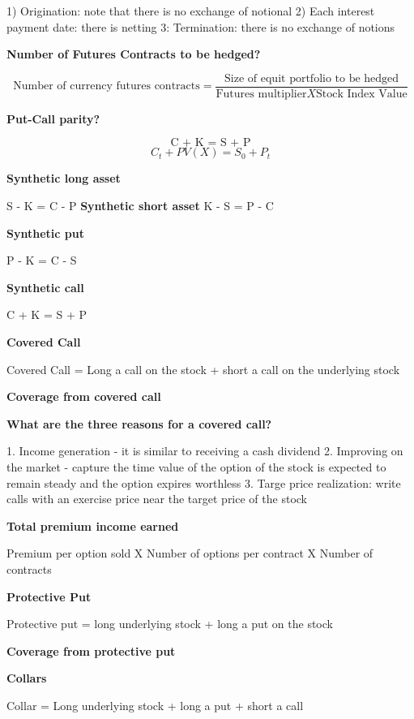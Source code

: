 \documentclass[12pt]{article}
\begin{document}
1) Origination: note that there is no exchange of notional
2) Each interest payment date: there is netting
3: Termination: there is no exchange of notions



\textbf{Number of Futures Contracts to be hedged?}

$$
\text{Number of currency futures contracts} = \dfrac{\text{Size of equit portfolio to be hedged}}{\text{Futures multiplier} X \text{Stock Index Value}}
$$



\textbf{Put-Call parity?}

$$
\text{C + K = S + P} 
$$
$$
{C_t + PV(X) = S_0 + P_t}
$$


\begin{framed}

\textbf{Synthetic long asset}

S - K = C - P
\textbf{Synthetic short asset}
K - S = P - C

\textbf{Synthetic put}

P -  K   = C - S

\textbf{Synthetic call}
	
C + K = S + P

\end{framed}


\textbf{Covered Call}

Covered Call = Long a call on the stock + short a call on the underlying stock 

\textbf{Coverage from covered call}

\textbf{What are the three reasons for a covered call?}

1. Income generation - it is similar to receiving a cash dividend
2. Improving on the market - capture the time value of the option of the stock is expected to remain steady and the option expires worthless
3. Targe price realization: write calls with an exercise price near the target price of the stock 

\textbf{Total premium income earned}

Premium per option sold X Number of options per contract X Number of contracts

\textbf{Protective Put}

Protective put = long underlying stock + long a put on the stock

\textbf{Coverage from protective put}

\textbf{Collars}

Collar = Long underlying stock + long a put + short a call
\end{document}
